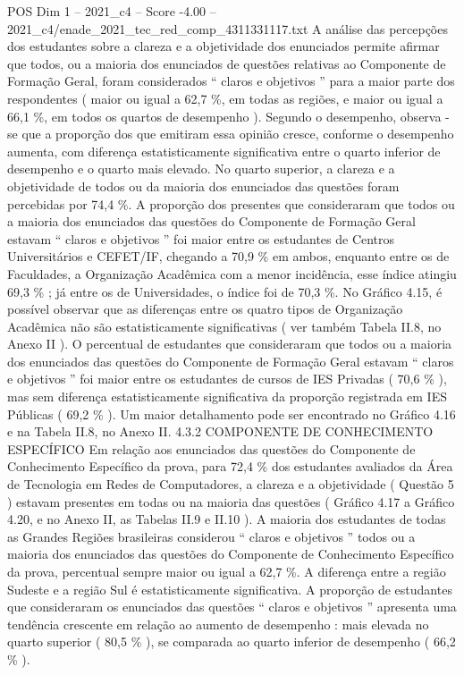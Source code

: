 \begin{textsample}{POS Dim 1 – 2021\_c4 – Score -4.00 – 2021\_c4/enade\_2021\_tec\_red\_comp\_4311331117.txt}
A análise das percepções dos estudantes sobre a clareza e a objetividade dos enunciados permite afirmar que todos, ou a maioria dos enunciados de questões relativas ao Componente de Formação Geral, foram considerados “ claros e objetivos ” para a maior parte dos respondentes ( maior ou igual a 62,7 \%, em todas as regiões, e maior ou igual a 66,1 \%, em todos os quartos de desempenho ).
Segundo o desempenho, observa -se que a proporção dos que emitiram essa opinião cresce, conforme o desempenho aumenta, com diferença estatisticamente significativa entre o quarto inferior de desempenho e o quarto mais elevado.
No quarto superior, a clareza e a objetividade de todos ou da maioria dos enunciados das questões foram percebidas por 74,4 \%.
A proporção dos presentes que consideraram que todos ou a maioria dos enunciados das questões do Componente de Formação Geral estavam “ claros e objetivos ” foi maior entre os estudantes de Centros Universitários e CEFET/IF, chegando a 70,9 \% em ambos, enquanto entre os de Faculdades, a Organização Acadêmica com a menor incidência, esse índice atingiu 69,3 \% ; já entre os de Universidades, o índice foi de 70,3 \%.
No Gráfico 4.15, é possível observar que as diferenças entre os quatro tipos de Organização Acadêmica não são estatisticamente significativas ( ver também Tabela II.8, no Anexo II ).
O percentual de estudantes que consideraram que todos ou a maioria dos enunciados das questões do Componente de Formação Geral estavam “ claros e objetivos ” foi maior entre os estudantes de cursos de IES Privadas ( 70,6 \% ), mas sem diferença estatisticamente significativa da proporção registrada em IES Públicas ( 69,2 \% ).
Um maior detalhamento pode ser encontrado no Gráfico 4.16 e na Tabela II.8, no Anexo II. 4.3.2 COMPONENTE DE CONHECIMENTO ESPECÍFICO Em relação aos enunciados das questões do Componente de Conhecimento Específico da prova, para 72,4 \% dos estudantes avaliados da Área de Tecnologia em Redes de Computadores, a clareza e a objetividade ( Questão 5 ) estavam presentes em todas ou na maioria das questões ( Gráfico 4.17 a Gráfico 4.20, e no Anexo II, as Tabelas II.9 e II.10 ).
A maioria dos estudantes de todas as Grandes Regiões brasileiras considerou “ claros e objetivos ” todos ou a maioria dos enunciados das questões do Componente de Conhecimento Específico da prova, percentual sempre maior ou igual a 62,7 \%.
A diferença entre a região Sudeste e a região Sul é estatisticamente significativa.
A proporção de estudantes que consideraram os enunciados das questões “ claros e objetivos ” apresenta uma tendência crescente em relação ao aumento de desempenho : mais elevada no quarto superior ( 80,5 \% ), se comparada ao quarto inferior de desempenho ( 66,2 \% ).

\end{textsample}
